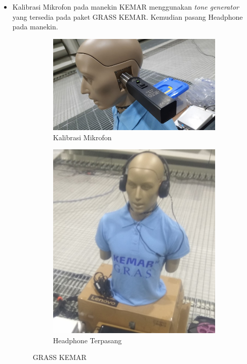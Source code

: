 \documentclass[12pt,]{article}
\begin{document}
\begin{itemize}
		\newpage
		\item Kalibrasi Mikrofon pada manekin KEMAR menggunakan \textit{tone generator} yang tersedia pada paket GRASS KEMAR.
		Kemudian pasang Headphone pada manekin.
		\begin{figure}[!ht]
			\centering
			\begin{subfigure}[b]{0.3\textwidth}
				\includegraphics[width=\textwidth]{images/foto/calib}
				\caption{Kalibrasi Mikrofon}
			\end{subfigure}
			\begin{subfigure}[b]{0.3\textwidth}
				\includegraphics[width=\textwidth]{images/foto/kemar}
				\caption{Headphone Terpasang}
			\end{subfigure}
			\caption{GRASS KEMAR}
		\end{figure}

	\end{itemize}
\end{document}
